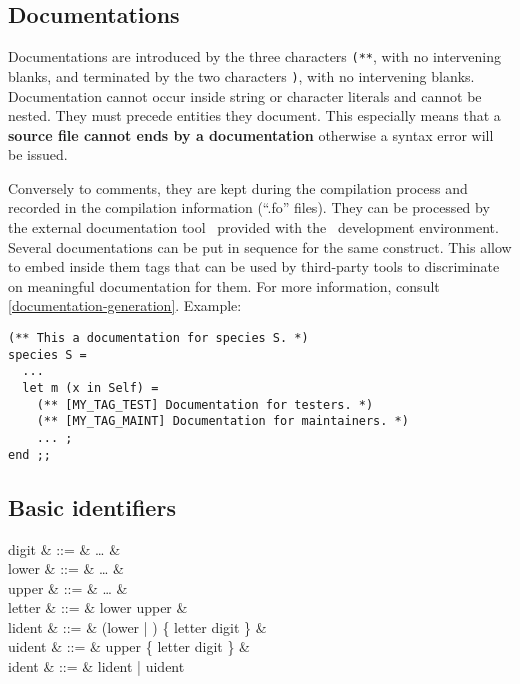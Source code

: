 \subsection{Documentations}
Documentations are introduced by the three characters {\tt (**},
with no intervening blanks, and terminated by the two characters
{\tt *)}, with no intervening blanks.
Documentation cannot occur inside string or character literals and
cannot be nested. They must precede entities they document. This
especially means that a
{\bf source file cannot ends by a documentation} otherwise a syntax
error will be issued.

Conversely to comments, they are kept during the compilation process
and recorded in the compilation information (``.fo'' files). They can
be processed by the external documentation tool \focdoc\ provided with
the \focal\ development environment. Several documentations can be put
in sequence for the same construct. This allow to embed inside them
tags that can be used by third-party tools to discriminate on
meaningful documentation for them. For more information, consult
\ref{documentation-generation}.
Example:
{\scriptsize
\begin{lstlisting}
(** This a documentation for species S. *)
species S =
  ...
  let m (x in Self) =
    (** [MY_TAG_TEST] Documentation for testers. *)
    (** [MY_TAG_MAINT] Documentation for maintainers. *)
    ... ;
end ;;
\end{lstlisting}
}



\subsection{Basic identifiers}
\vspace{0.2cm}
\begin{syntax}
digit & ::= & \ldots {} & \\
lower & ::= &  \ldots {} & \\
upper & ::= &  \ldots {} & \\
letter & ::= & lower \mid upper & \\
lident & ::= & (lower | \terminal{\_})
            \{ letter \mid digit \mid \terminal{\_} \} & \\
uident & ::= & upper \{ letter \mid digit \mid \terminal{\_} \} & \\
ident & ::= & lident | uident
\end{syntax}
\vspace{0.2cm}

